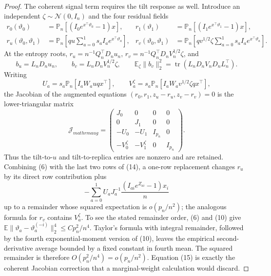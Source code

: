 \documentclass{article}
\begin{document}
\begin{proof}
The coherent signal term requires the tilt response as well.  Introduce an independent \(\zeta\sim\mathcal N(0,I_n)\) and the four residual fields
\[
 \begin{aligned}
 r_0(\vartheta_0)&=\mathbb P_n[(I_0e^{x^{\top}\vartheta_0}-1)x],
 &r_1(\vartheta_1)&=\mathbb P_n[(I_1e^{x^{\top}\vartheta_1}-1)x],\\
 r_u(\vartheta_0,\vartheta_1)&=
 \mathbb P_n\!\left[q u\sum_{a=0}^1s_aI_ae^{x^{\top}\vartheta_a}\right],
 &r_v(\vartheta_0,\vartheta_1)&=
 \mathbb P_n\!\left[q v^{1/2}\zeta\sum_{a=0}^1s_aI_ae^{x^{\top}\vartheta_a}\right].
 \end{aligned}
 \tag{12}
\]
At the entropy roots, \(r_u=n^{-1}Q_n^{\top}D_nu_n\), \(r_v=n^{-1}Q_n^{\top}D_nV_n^{1/2}\zeta\), and
\[
 b_u=L_nD_nu_n,
 \qquad
 b_v=L_nD_nV_n^{1/2}\zeta,
 \qquad
 \mathbb E_\zeta\|b_v\|_2^2=
 \operatorname{tr}(L_nD_nV_nD_nL_n^{\top}).
 \tag{13}
\]
Writing
\[
 U_a=s_a\mathbb P_n[I_aW_auq x^{\top}],
 \qquad
 V_a^{\zeta}=s_a\mathbb P_n[I_aW_av^{1/2}\zeta qx^{\top}],
\]
the Jacobian of the augmented equations \((r_0,r_1,z_u-r_u,z_v-r_v)=0\) is the lower-triangular matrix
\[
 \mathcal J_{mathrm{aug}}=
 \begin{pmatrix}
 J_0&0&0&0\\
 0&J_1&0&0\\
 -U_0&-U_1&I_{p_n}&0\\
 -V_0^{\zeta}&-V_1^{\zeta}&0&I_{p_n}
 \end{pmatrix}.
 \tag{14}
\]
Thus the tilt-to-\(u\) and tilt-to-replica entries are nonzero and are retained.  Combining (6) with the last two rows of (14), a one-row replacement changes \(r_u\) by its direct row contribution plus
\[
 -\sum_{a=0}^1U_aJ_a^{-1}
 \frac{(I_{ai}e^{Z_{ai}}-1)x_i}{n}
 \tag{15}
\]
up to a remainder whose squared expectation is \(o(p_n/n^2)\); the analogous formula for \(r_v\) contains \(V_a^{\zeta}\).  To see the stated remainder order, (6) and (10) give \(\mathbb E\|\vartheta_a-\vartheta_a^{(-i)}\|_2^4\le Cp_n^2/n^4\).  Taylor's formula with integral remainder, followed by the fourth exponential-moment version of (10), leaves the empirical second-derivative average bounded by a fixed constant in fourth mean.  The squared remainder is therefore \(O(p_n^2/n^4)=o(p_n/n^2)\).  Equation (15) is exactly the coherent Jacobian correction that a marginal-weight calculation would discard.


\end{proof}
\end{document}
